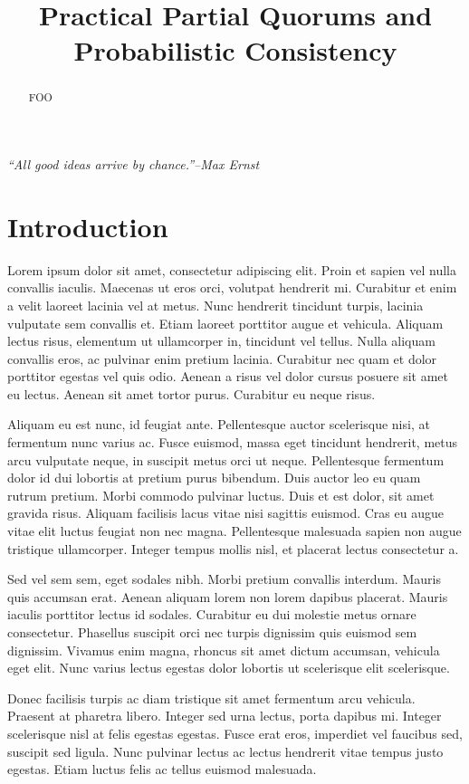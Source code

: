 \documentclass{vldb}
\title{Practical Partial Quorums and Probabilistic Consistency}
\begin{document}
\maketitle

\noindent\textit{``All good ideas arrive by chance.''--Max Ernst}

\begin{abstract} FOO
\end{abstract}

\section{Introduction}Lorem ipsum dolor sit amet, consectetur adipiscing elit. Proin et sapien vel nulla convallis iaculis. Maecenas ut eros orci, volutpat hendrerit mi. Curabitur et enim a velit laoreet lacinia vel at metus. Nunc hendrerit tincidunt turpis, lacinia vulputate sem convallis et. Etiam laoreet porttitor augue et vehicula. Aliquam lectus risus, elementum ut ullamcorper in, tincidunt vel tellus. Nulla aliquam convallis eros, ac pulvinar enim pretium lacinia. Curabitur nec quam et dolor porttitor egestas vel quis odio. Aenean a risus vel dolor cursus posuere sit amet eu lectus. Aenean sit amet tortor purus. Curabitur eu neque risus.

Aliquam eu est nunc, id feugiat ante. Pellentesque auctor scelerisque nisi, at fermentum nunc varius ac. Fusce euismod, massa eget tincidunt hendrerit, metus arcu vulputate neque, in suscipit metus orci ut neque. Pellentesque fermentum dolor id dui lobortis at pretium purus bibendum. Duis auctor leo eu quam rutrum pretium. Morbi commodo pulvinar luctus. Duis et est dolor, sit amet gravida risus. Aliquam facilisis lacus vitae nisi sagittis euismod. Cras eu augue vitae elit luctus feugiat non nec magna. Pellentesque malesuada sapien non augue tristique ullamcorper. Integer tempus mollis nisl, et placerat lectus consectetur a.

Sed vel sem sem, eget sodales nibh. Morbi pretium convallis interdum. Mauris quis accumsan erat. Aenean aliquam lorem non lorem dapibus placerat. Mauris iaculis porttitor lectus id sodales. Curabitur eu dui molestie metus ornare consectetur. Phasellus suscipit orci nec turpis dignissim quis euismod sem dignissim. Vivamus enim magna, rhoncus sit amet dictum accumsan, vehicula eget elit. Nunc varius lectus egestas dolor lobortis ut scelerisque elit scelerisque.

Donec facilisis turpis ac diam tristique sit amet fermentum arcu vehicula. Praesent at pharetra libero. Integer sed urna lectus, porta dapibus mi. Integer scelerisque nisl at felis egestas egestas. Fusce erat eros, imperdiet vel faucibus sed, suscipit sed ligula. Nunc pulvinar lectus ac lectus hendrerit vitae tempus justo egestas. Etiam luctus felis ac tellus euismod malesuada.
\end{document}
